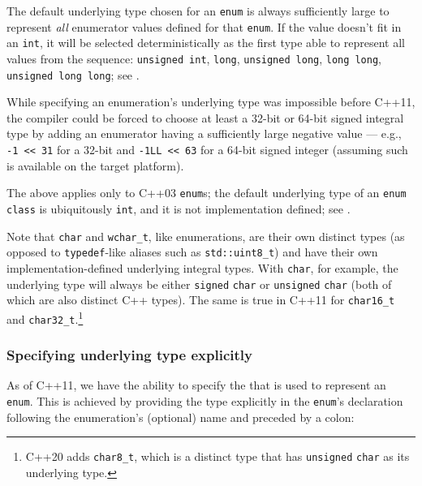 \noindent The default underlying type chosen for an \lstinline!enum! is always
sufficiently large to represent \emph{all} enumerator values defined for
that \lstinline!enum!. If the value doesn't fit in an \lstinline!int!, it will
be selected deterministically as the first type able to represent all
values from the sequence: \lstinline!unsigned!~\lstinline!int!, \lstinline!long!,
\lstinline!unsigned!~\lstinline!long!, \lstinline!long!~\lstinline!long!,
\lstinline!unsigned!~\lstinline!long!~\lstinline!long!; see .

While specifying an enumeration’s underlying type was impossible before C++11, the compiler could be forced to choose at least a 32-bit or 64-bit signed integral type by adding an enumerator having a sufficiently large negative value --- e.g., \lstinline!-1 << 31! for a 32-bit and \lstinline!-1LL << 63! for a 64-bit signed integer (assuming such is available on the target platform).

The above applies only to C++03 \lstinline!enum!s; the default underlying type of an \lstinline!enum! \lstinline!class! is ubiquitously \lstinline!int!, and it is not implementation defined; see .

Note that \lstinline!char! and \lstinline!wchar_t!, like enumerations, are their own distinct types (as opposed to \lstinline!typedef!-like aliases such as \lstinline!std::uint8_t!) and have their own implementation-defined underlying integral types. With \lstinline!char!, for example, the underlying type will always be either \lstinline!signed! \lstinline!char! or \lstinline!unsigned! \lstinline!char! (both of which are also distinct C++ types). The same is true in C++11 for \lstinline!char16_t! and \lstinline!char32_t!.{\protect\footnote{C++20 adds \lstinline!char8_t!, which is a distinct type that has \lstinline!unsigned! \lstinline!char! as its underlying type.}}

\subsubsection[Specifying underlying type explicitly]{Specifying underlying type explicitly}\label{specifying-underlying-type-explicitly}

As of C++11, we have the ability to specify the 
that is used to represent an \lstinline!enum!. This is achieved by
providing the type explicitly in the \lstinline!enum!'s declaration
following the enumeration's (optional) name and preceded by a colon:

